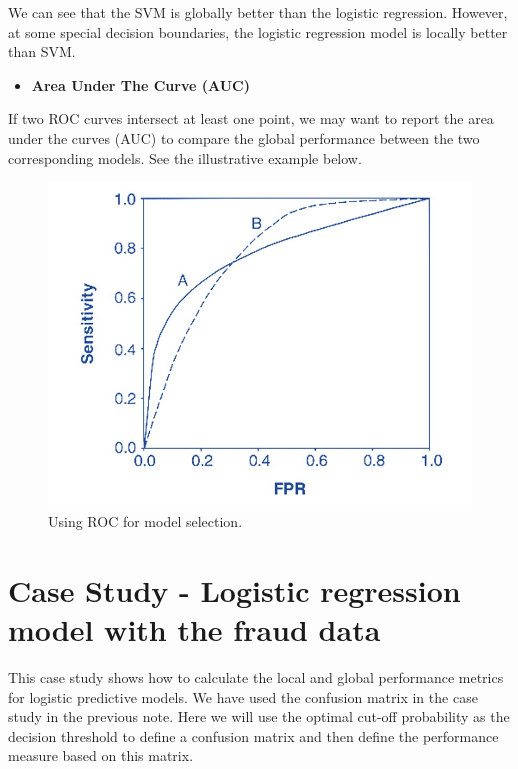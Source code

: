 \documentclass[
]{book}
\providecommand{\tightlist}{%
  \setlength{\itemsep}{0pt}\setlength{\parskip}{0pt}}
\begin{document}
We can see that the SVM is globally better than the logistic regression. However, at some special decision boundaries, the logistic regression model is locally better than SVM.

\begin{itemize}
\tightlist
\item
  \textbf{Area Under The Curve (AUC)}
\end{itemize}

If two ROC curves intersect at least one point, we may want to report the area under the curves (AUC) to compare the global performance between the two corresponding models. See the illustrative example below.

\begin{figure}

{\centering \includegraphics[width=0.8\linewidth]{img06/w06-Equal-AUC-ROC} 

}

\caption{Using ROC for model selection.}\label{fig:unnamed-chunk-131}
\end{figure}

\hypertarget{case-study---logistic-regression-model-with-the-fraud-data}{%
\section{Case Study - Logistic regression model with the fraud data}\label{case-study---logistic-regression-model-with-the-fraud-data}}

This case study shows how to calculate the local and global performance metrics for logistic predictive models. We have used the confusion matrix in the case study in the previous note. Here we will use the optimal cut-off probability as the decision threshold to define a confusion matrix and then define the performance measure based on this matrix.
\end{document}
